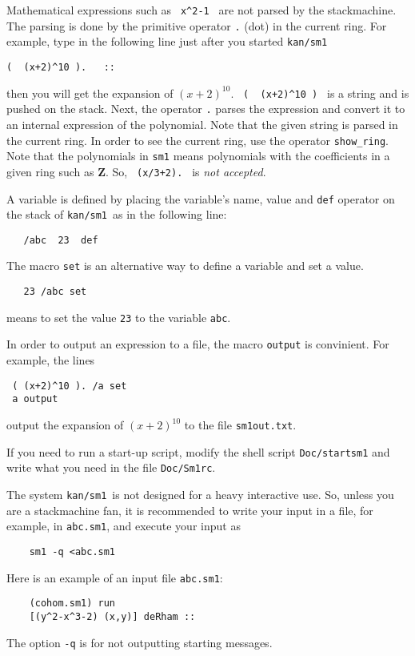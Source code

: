 \documentclass{article}
\def\kansm{ {\tt kan/sm1}\ }
\begin{document}
Mathematical expressions such as \verb! x^2-1 ! are not parsed by the
stackmachine. 
The parsing is done by the primitive operator {\tt .} (dot) in the current
ring.
For example,  type in the following line just after you started \kansm
\begin{verbatim}
(  (x+2)^10 ).   ::
\end{verbatim}
then you will get the expansion of $ (x+2)^{10} $.
\verb! (  (x+2)^10 ) ! is a string and is pushed on the stack.
Next, the operator {\tt .} parses the expression and convert it
to an internal expression of the polynomial.
Note that the given string is parsed in the current ring.
In order to see the current ring, use the operator
{\tt show\_ring}.
Note that the polynomials in {\tt sm1} means
polynomials with the coefficients in a given ring such as {\bf Z}.
So,
\verb! (x/3+2). !
is {\em not accepted}.

A variable is defined by placing the variable's name, value and 
{\tt def} operator on the stack of \kansm as in the following
line:
\begin{verbatim}
   /abc  23  def
\end{verbatim}
The macro {\tt set} is an alternative way to define a variable and set a value.
\begin{verbatim}
   23 /abc set
\end{verbatim}
means to set the value {\tt 23} to the variable {\tt abc}.

In order to output an expression to a file,
the macro {\tt output} is convinient.
For example, the lines
\begin{verbatim}
 ( (x+2)^10 ). /a set
 a output
\end{verbatim}
output the expansion of $(x+2)^{10}$ to the file
{\tt sm1out.txt}.

If you need to run a start-up script, 
modify the shell script {\tt Doc/startsm1} and write what you need
in the file {\tt Doc/Sm1rc}.

\smallbreak
The system \kansm  is not designed for a heavy interactive use.
So, unless you are a stackmachine fan,
it is recommended to write your input in a file, for example,
in {\tt abc.sm1}, and execute your input as
{\footnotesize \begin{verbatim}
    sm1 -q <abc.sm1
\end{verbatim}}
\noindent Here is an example of an input file {\tt abc.sm1}:
{\footnotesize \begin{verbatim}
    (cohom.sm1) run
    [(y^2-x^3-2) (x,y)] deRham ::
\end{verbatim}}
\noindent The option {\tt -q} is for not outputting starting messages.
\end{document}
